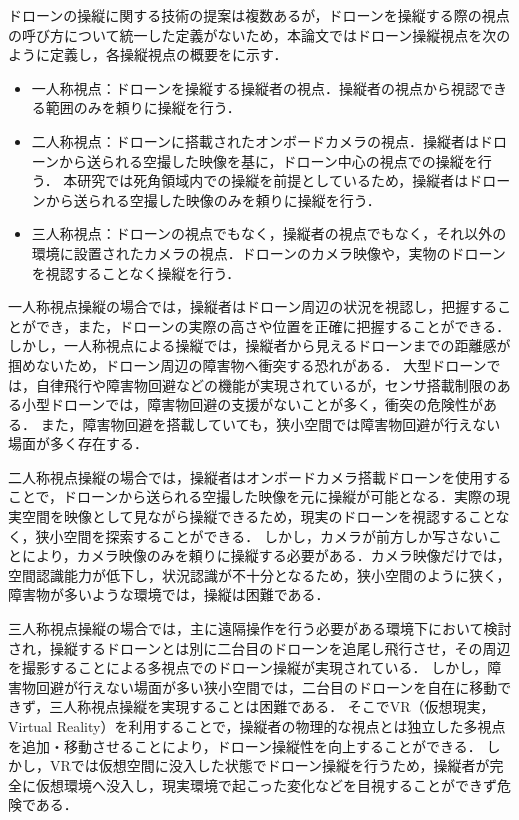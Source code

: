 \documentclass[a4paper,11pt]{ujreport}
\begin{document}
\par
ドローンの操縦に関する技術の提案は複数あるが\cite{article-drone07}\cite{article-ar01}\cite{book-drone05}，ドローンを操縦する際の視点の呼び方について統一した定義がないため，本論文ではドローン操縦視点を次のように定義し，各操縦視点の概要をに示す．
\begin{itemize}
  \item 一人称視点\mbox{}：ドローンを操縦する操縦者の視点．操縦者の視点から視認できる範囲のみを頼りに操縦を行う．
  \item 二人称視点\mbox{}：ドローンに搭載されたオンボードカメラの視点．操縦者はドローンから送られる空撮した映像を基に，ドローン中心の視点での操縦を行う．
  本研究では死角領域内での操縦を前提としているため，操縦者はドローンから送られる空撮した映像のみを頼りに操縦を行う．
  \item 三人称視点\mbox{}：ドローンの視点でもなく，操縦者の視点でもなく，それ以外の環境に設置されたカメラの視点．ドローンのカメラ映像や，実物のドローンを視認することなく操縦を行う．
\end{itemize}
\par
一人称視点操縦の場合では，操縦者はドローン周辺の状況を視認し，把握することができ，また，ドローンの実際の高さや位置を正確に把握することができる\cite{book-drone02}．
しかし，一人称視点による操縦では，操縦者から見えるドローンまでの距離感が掴めないため\cite{article-ar01}\cite{article-ar02}，ドローン周辺の障害物へ衝突する恐れがある．
大型ドローンでは，自律飛行や障害物回避などの機能が実現されているが，センサ搭載制限のある小型ドローンでは，障害物回避の支援がないことが多く，衝突の危険性がある．
また，障害物回避を搭載していても，狭小空間では障害物回避が行えない場面が多く存在する\cite{article-drone12}．
\par
二人称視点操縦の場合では，操縦者はオンボードカメラ搭載ドローンを使用することで，ドローンから送られる空撮した映像を元に操縦が可能となる\cite{article-drone08}．実際の現実空間を映像として見ながら操縦できるため，現実のドローンを視認することなく，狭小空間を探索することができる\cite{book-drone02}．
しかし，カメラが前方しか写さないことにより\cite{article-drone09}，カメラ映像のみを頼りに操縦する必要がある．カメラ映像だけでは，空間認識能力が低下し\cite{article-drone10}，状況認識が不十分となるため\cite{article-drone11}\cite{book-drone03}，狭小空間のように狭く，障害物が多いような環境では，操縦は困難である．
\par
三人称視点操縦の場合では，主に遠隔操作を行う必要がある環境下において検討され，操縦するドローンとは別に二台目のドローンを追尾し飛行させ，その周辺を撮影することによる多視点でのドローン操縦が実現されている\cite{book-drone05}．
しかし，障害物回避が行えない場面が多い狭小空間では，二台目のドローンを自在に移動できず，三人称視点操縦を実現することは困難である．
そこでVR（仮想現実，Virtual Reality）を利用することで，操縦者の物理的な視点とは独立した多視点を追加・移動させることにより，ドローン操縦性を向上することができる\cite{book-drone04}．
しかし，VRでは仮想空間に没入した状態でドローン操縦を行うため\cite{article-drone13}，操縦者が完全に仮想環境へ没入し，現実環境で起こった変化などを目視することができず危険である．
\end{document}
